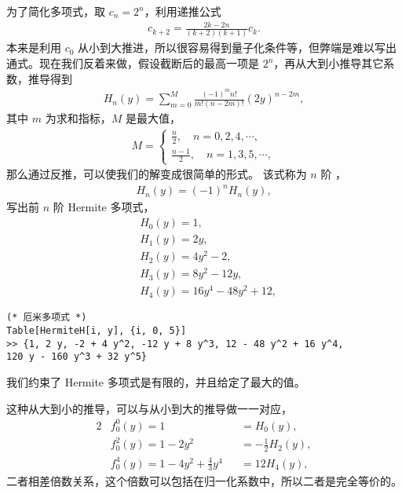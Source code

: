 为了简化多项式，取 $c_n = 2^n$，利用递推公式
\begin{align}
    c_{k+2} = \frac{2k - 2n}{(k+2)(k+1)}c_k. 
\end{align}
本来是利用 $c_0$ 从小到大推进，所以很容易得到量子化条件等，但弊端是难以写出通式。现在我们反着来做，假设截断后的最高一项是 $2^n$，再从大到小推导其它系数，推导得到
\begin{align}
    H_n(y) = \sum_{m=0}^M \frac{(-1)^m n!}{m! (n-2m)!} (2y)^{n-2m}, 
\end{align}
其中 $m$ 为求和指标，$M$ 是最大值，
\begin{align}
    M = \begin{cases}
        \frac n2, \quad n = 0, 2, 4, \cdots, \\
        \frac{n-1}2, \quad n=1,3,5,\cdots,
    \end{cases}
\end{align}
那么通过反推，可以使我们的解变成很简单的形式。
该式称为 $n$ 阶 ，
\begin{align}
    H_n(y) = (-1)^n H_n(y), \label{eq:nth_hermitian_poly}
\end{align}
写出前 $n$ 阶 Hermite 多项式，
\begin{align}
    &H_0 (y) = 1, \\
    &H_1(y) = 2y,\\
    &H_2(y) = 4 y^2 - 2, \\
    &H_3(y) = 8 y^2 - 12 y, \\
    &H_4(y) = 16 y^4 - 48 y^2 + 12, 
\end{align}
\begin{lstlisting}
(* 厄米多项式 *)
Table[HermiteH[i, y], {i, 0, 5}]
>> {1, 2 y, -2 + 4 y^2, -12 y + 8 y^3, 12 - 48 y^2 + 16 y^4, 
120 y - 160 y^3 + 32 y^5}
\end{lstlisting}
我们约束了 Hermite 多项式是有限的，并且给定了最大的值。

这种从大到小的推导，可以与从小到大的推导做一一对应，
\begin{alignat}{2}
    &f_0^0(y) = 1 &&=H_0(y),\\
    &f_0^2(y) = 1 - 2y^2  && = - \frac12 H_2(y), \\
    &f_0^4(y) = 1- 4 y^2 + \frac43 y^4 && = 12 H_4(y),
\end{alignat}
二者相差倍数关系，这个倍数可以包括在归一化系数中，所以二者是完全等价的。

